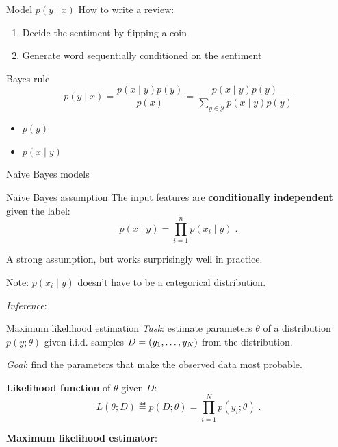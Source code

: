\documentclass[usenames,dvipsnames,notes]{beamer}
\begin{document}
\begin{frame}
    {Model $p(y\mid x)$}
    How to write a review:\\
    \begin{enumerate}
        \item Decide the sentiment by flipping a coin
        \item Generate word sequentially conditioned on the sentiment 
    \end{enumerate}
    \begin{block}
        {Bayes rule}
        $$
        p(y\mid x) = \frac{p(x\mid y)p(y)}{p(x)}
        = \frac{p(x\mid y)p(y)}{\sum_{y\in\mathcal{Y}} p(x\mid y)p(y)}
        $$
    \end{block}
    \begin{itemize}
        \item $p(y)$
        \item $p(x\mid y)$
    \end{itemize}
\end{frame}

\begin{frame}
    {Naive Bayes models}
    \begin{block}
    {Naive Bayes assumption}
        The input features are \textbf{conditionally independent} given the label:
        $$
        p(x\mid y) = \prod_{i=1}^n p(x_i\mid y) \;.
        $$
    \end{block}
    A strong assumption, but works surprisingly well in practice.

    Note: $p(x_i\mid y)$ doesn't have to be a categorical distribution.

    \emph{Inference}:\\
    \vspace{5em}
\end{frame}

\begin{frame}
    {Maximum likelihood estimation}
    \emph{Task}: estimate parameters $\theta$ of a distribution $p(y; \theta)$ given i.i.d. samples $D=\left( y_1, \ldots, y_N \right)$ from the distribution.

    \emph{Goal}: find the parameters that make the observed data most probable.

    \textbf{Likelihood function} of $\theta$ given $D$:
    $$
    L(\theta; D) \eqdef p(D;\theta) = \prod_{i=1}^N p(y_i; \theta) \;.
    $$

    \textbf{Maximum likelihood estimator}:\\
    \vspace{7em}
\end{frame}
\end{document}
